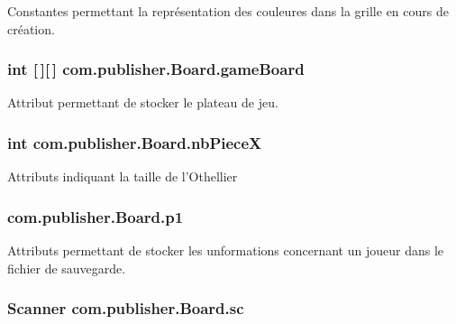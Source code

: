 Constantes permettant la représentation des couleures dans la grille en cours de création. \hypertarget{classcom_1_1publisher_1_1Board_a63b25502fe4b514d7d4064ae95ab083a}{
\subsubsection[{game\-Board}]{\setlength{\rightskip}{0pt plus 5cm}int \mbox{[}$\,$\mbox{]}\mbox{[}$\,$\mbox{]} com.\-publisher.\-Board.\-game\-Board\hspace{0.3cm}{\ttfamily [private]}}}\label{classcom_1_1publisher_1_1Board_a63b25502fe4b514d7d4064ae95ab083a}
Attribut permettant de stocker le plateau de jeu. \hypertarget{classcom_1_1publisher_1_1Board_a694af9db45cbdf41ac712245da628de9}{
\subsubsection[{nb\-Piece\-X}]{\setlength{\rightskip}{0pt plus 5cm}int com.\-publisher.\-Board.\-nb\-Piece\-X\hspace{0.3cm}{\ttfamily [private]}}}\label{classcom_1_1publisher_1_1Board_a694af9db45cbdf41ac712245da628de9}
Attributs indiquant la taille de l'Othellier \hypertarget{classcom_1_1publisher_1_1Board_a0c709ad0c2ab5f0373caa1c01e5b3f97}{
\subsubsection[{p1}]{ com.\-publisher.\-Board.\-p1\hspace{0.3cm}{\ttfamily [private]}}}\label{classcom_1_1publisher_1_1Board_a0c709ad0c2ab5f0373caa1c01e5b3f97}
Attributs permettant de stocker les unformations concernant un joueur dans le fichier de sauvegarde. \hypertarget{classcom_1_1publisher_1_1Board_a1b738f8b96aa62e1ef25b5390b04594a}{
\subsubsection[{sc}]{\setlength{\rightskip}{0pt plus 5cm}Scanner com.\-publisher.\-Board.\-sc\hspace{0.3cm}{\ttfamily [private]}}}\label{classcom_1_1publisher_1_1Board_a1b738f8b96aa62e1ef25b5390b04594a}
